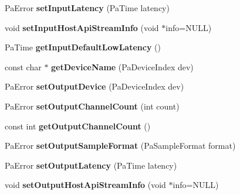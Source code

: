 \begin{DoxyCompactItemize}
\item 
\hypertarget{class_port_audio_wrap_a79575cbf76ba487b4edc3e6188e680ad}{Pa\-Error {\bfseries set\-Input\-Latency} (Pa\-Time latency)}\label{class_port_audio_wrap_a79575cbf76ba487b4edc3e6188e680ad}

\item 
\hypertarget{class_port_audio_wrap_a5ce5a1875848b5c93fb769d4186dbcf3}{void {\bfseries set\-Input\-Host\-Api\-Stream\-Info} (void $\ast$info=N\-U\-L\-L)}\label{class_port_audio_wrap_a5ce5a1875848b5c93fb769d4186dbcf3}

\item 
\hypertarget{class_port_audio_wrap_af2b23ddbc2df1f3a8f20ba59db2e26eb}{Pa\-Time {\bfseries get\-Input\-Default\-Low\-Latency} ()}\label{class_port_audio_wrap_af2b23ddbc2df1f3a8f20ba59db2e26eb}

\item 
\hypertarget{class_port_audio_wrap_a17132c9ddbe6b7a184ad5d3ecf4aa66e}{const char $\ast$ {\bfseries get\-Device\-Name} (Pa\-Device\-Index dev)}\label{class_port_audio_wrap_a17132c9ddbe6b7a184ad5d3ecf4aa66e}

\item 
\hypertarget{class_port_audio_wrap_ac5fdc035a033cf426f259d4bac87e4ca}{Pa\-Error {\bfseries set\-Output\-Device} (Pa\-Device\-Index dev)}\label{class_port_audio_wrap_ac5fdc035a033cf426f259d4bac87e4ca}

\item 
\hypertarget{class_port_audio_wrap_aac39854526473140e2b9bcf6c30ce876}{Pa\-Error {\bfseries set\-Output\-Channel\-Count} (int count)}\label{class_port_audio_wrap_aac39854526473140e2b9bcf6c30ce876}

\item 
\hypertarget{class_port_audio_wrap_a29ae357027ce0ac70f52c5a8fc416b16}{const int {\bfseries get\-Output\-Channel\-Count} ()}\label{class_port_audio_wrap_a29ae357027ce0ac70f52c5a8fc416b16}

\item 
\hypertarget{class_port_audio_wrap_a342018893c092acac26509351b45602f}{Pa\-Error {\bfseries set\-Output\-Sample\-Format} (Pa\-Sample\-Format format)}\label{class_port_audio_wrap_a342018893c092acac26509351b45602f}

\item 
\hypertarget{class_port_audio_wrap_a619ad8a126e30b328468a57c8047f2f8}{Pa\-Error {\bfseries set\-Output\-Latency} (Pa\-Time latency)}\label{class_port_audio_wrap_a619ad8a126e30b328468a57c8047f2f8}

\item 
\hypertarget{class_port_audio_wrap_ab7d9fc6cda5c61cda105e6d9bba9215c}{void {\bfseries set\-Output\-Host\-Api\-Stream\-Info} (void $\ast$info=N\-U\-L\-L)}\label{class_port_audio_wrap_ab7d9fc6cda5c61cda105e6d9bba9215c}


\end{DoxyCompactItemize}
